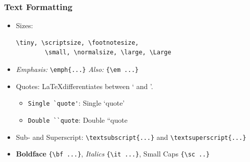 \documentclass{beamer}
\begin{document}
\begin{frame}[containsverbatim]
    \frametitle{Text Formatting}
    \begin{itemize}
        \item Sizes: \begin{verbatim}\tiny, \scriptsize, \footnotesize, 
        \small, \normalsize, \large, \Large \end{verbatim}
        \item \emph{Emphasis:} \verb|\emph{...}| {\em Also:} \verb|{\em ...}|
        \item Quotes: \LaTeX differentiates between ` and '.
        \begin{itemize}
            \item \verb|Single `quote'|: Single `quote'
            \item \verb|Double ``quote|: Double ``quote
        \end{itemize}
        \item Sub- and Superscript: \verb|\textsubscript{...}| and \verb|\textsuperscript{...}|
        \item {\bf Boldface} \verb|{\bf ...}|, {\it Italics} \verb|{\it ...}|, {\sc Small Caps} \verb|{\sc ..}| 
    \end{itemize}
\end{frame}
\end{document}
